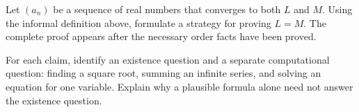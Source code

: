 \begin{exercise}
Let $(a_n)$ be a sequence of real numbers that converges to both $L$ and $M$. Using the informal definition above, formulate a strategy for proving $L=M$. The complete proof appears after the necessary order facts have been proved.
\end{exercise}

\begin{exercise}
For each claim, identify an existence question and a separate computational
question: finding a square root, summing an infinite series, and solving an
equation for one variable. Explain why a plausible formula alone need not
answer the existence question.
\end{exercise}
